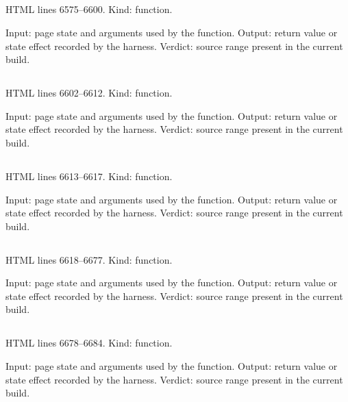 \subsection*{\texttt{}}
\label{vf_317_ccStatus}
HTML lines 6575--6600. Kind: function.

Input: page state and arguments used by the function.
Output: return value or state effect recorded by the harness.
Verdict: source range present in the current build.

\subsection*{\texttt{}}
\label{vf_318_ccSpark}
HTML lines 6602--6612. Kind: function.

Input: page state and arguments used by the function.
Output: return value or state effect recorded by the harness.
Verdict: source range present in the current build.

\subsection*{\texttt{}}
\label{vf_319_ccVersionMarks}
HTML lines 6613--6617. Kind: function.

Input: page state and arguments used by the function.
Output: return value or state effect recorded by the harness.
Verdict: source range present in the current build.

\subsection*{\texttt{}}
\label{vf_320_ccChartSvg}
HTML lines 6618--6677. Kind: function.

Input: page state and arguments used by the function.
Output: return value or state effect recorded by the harness.
Verdict: source range present in the current build.

\subsection*{\texttt{}}
\label{vf_321_ccSChartSvg}
HTML lines 6678--6684. Kind: function.

Input: page state and arguments used by the function.
Output: return value or state effect recorded by the harness.
Verdict: source range present in the current build.

